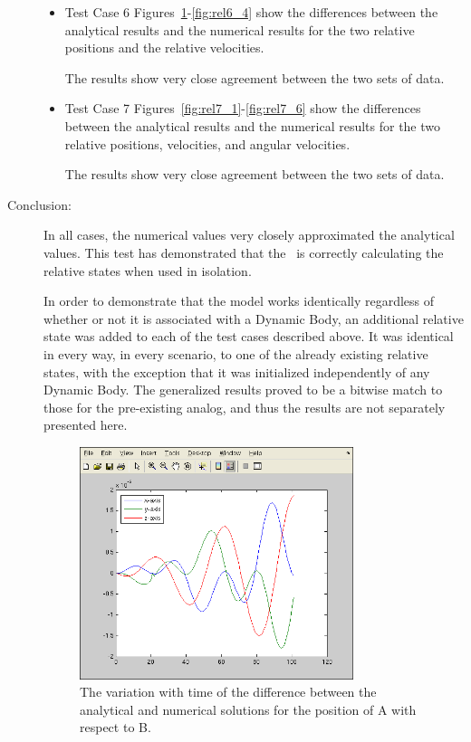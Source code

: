 \begin{description}
 \begin{itemize}
  \item Test Case 6 \newline
  Figures~\ref{fig:rel6_1}-\ref{fig:rel6_4} show the differences between the analytical results and the numerical results for the two relative positions and the relative velocities.
   
   The results show very close agreement between the two sets of data.

 \item Test Case 7 \newline
  Figures~\ref{fig:rel7_1}-\ref{fig:rel7_6} show the differences between the analytical results and the numerical results for the two relative positions, velocities, and angular velocities.
   
   The results show very close agreement between the two sets of data.
  \end{itemize}
  
\item[Conclusion:]
In all cases, the numerical values very closely approximated the analytical values.  This test has demonstrated that the \RelativeDesc\ is correctly calculating the relative states when used in isolation.

In order to demonstrate that the model works identically regardless of whether or not it is associated with a Dynamic Body, an additional relative state was added to each of the test cases described above. It was identical in every way, in every scenario, to one of the already existing relative states, with the exception that it was initialized independently of any Dynamic Body. The generalized results proved to be a bitwise match to those for the pre-existing analog, and thus the results are not separately presented here.
  
 \begin{figure}[!ht]
  \begin{center}
        \includegraphics[width=80mm]{figures/relative6_xab.png}
        \caption{The variation with time of the difference between the analytical and numerical solutions for the position of A with respect to B.}
        \label{fig:rel6_1}
  \end{center}
\end{figure}


\end{description}
